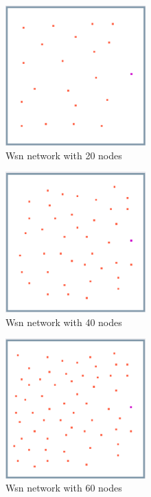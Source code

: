 \begin{figure}
  \centering
    \includegraphics[width=0.48\textwidth]{wsn_20_exp/1_wsn_20}%
    
  \caption{Wsn network with 20 nodes}
  \label{fig:wsn_20_exp/1_wsn_20}
\end{figure}

\begin{figure}
  \centering
    \includegraphics[width=0.48\textwidth]{wsn_40_exp/1_wsn_40}%
    
  \caption{Wsn network with 40 nodes}
  \label{fig:wsn_40_exp/1_wsn_40}
\end{figure}

\begin{figure}
  \centering
    \includegraphics[width=0.48\textwidth]{wsn_60_exp/1_wsn_60}%
    
  \caption{Wsn network with 60 nodes}
  \label{fig:wsn_60_exp/1_wsn_60}
\end{figure}

